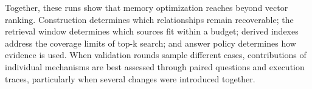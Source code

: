 Together, these runs show that memory optimization reaches beyond vector ranking. Construction determines which relationships remain recoverable; the retrieval window determines which sources fit within a budget; derived indexes address the coverage limits of top-k search; and answer policy determines how evidence is used. When validation rounds sample different cases, contributions of individual mechanisms are best assessed through paired questions and execution traces, particularly when several changes were introduced together.

